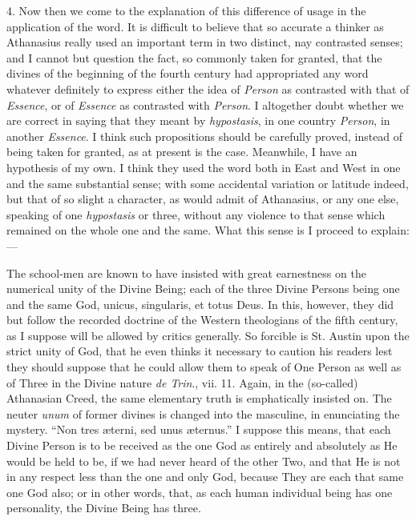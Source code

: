 4. Now then we come to the explanation of this difference of usage
in the application of the word. It is difficult to believe that so
accurate a thinker as Athanasius really used an important term in two
distinct, nay contrasted senses; and I cannot but question the fact,
so commonly taken for granted, that the divines of the beginning of
the fourth century had appropriated any word whatever definitely to
express either the idea of \emph{Person} as contrasted with that of \emph{Essence},
or of \emph{Essence} as contrasted with \emph{Person}. I altogether
doubt whether we are correct in saying that they meant by \emph{hypostasis},
in one country \emph{Person}, in another \emph{Essence}. I think such
propositions should be carefully proved, instead of being taken for
granted, as at present is the case. Meanwhile, I have an hypothesis of
my own. I think they used the word both in East and West in one and
the same substantial sense; with some accidental variation or latitude
indeed, but that of so slight a character, as would admit of
Athanasius, or any one else, speaking of one \emph{hypostasis} or
three, without any violence to that sense which remained on the whole
one and the same. What this sense is I proceed to explain:—

The school-men are known to have insisted with great earnestness on
the numerical unity of the Divine Being; each of the three Divine
Persons being one and the same God, unicus, singularis, et totus Deus.
In this, however, they did but follow the recorded doctrine of the
Western theologians of the fifth century, as I suppose will be allowed
by critics generally. So forcible is St. Austin upon the strict unity
of God, that he even thinks it necessary to caution his readers lest
they should suppose that he could allow them to speak of One
Person as well as of Three in the Divine nature \emph{de Trin}., vii.
11. Again, in the (so-called) Athanasian Creed, the same elementary
truth is emphatically insisted on. The neuter \emph{unum} of former
divines is changed into the masculine, in enunciating the mystery.
``Non tres æterni, sed unus æternus.'' I suppose this means,
that each Divine Person is to be received as the one God as entirely
and absolutely as He would be held to be, if we had never heard of the
other Two, and that He is not in any respect less than the one and
only God, because They are each that same one God also; or in other
words, that, as each human individual being has one personality, the
Divine Being has three.

